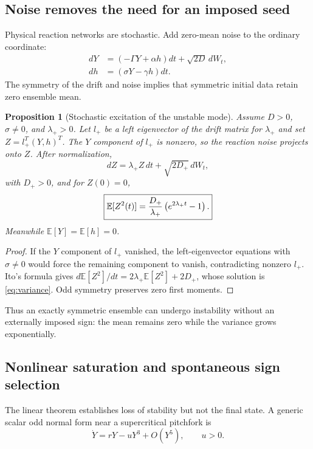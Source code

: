 \documentclass[11pt]{article}
\newtheorem{proposition}[theorem]{Proposition}
\theoremstyle{definition}
\theoremstyle{remark}
\begin{document}
\subsection{Noise removes the need for an imposed seed}
Physical reaction networks are stochastic.  Add zero-mean noise to the ordinary coordinate:
\begin{align}
 dY&=(-\Gamma Y+\alpha h)dt+\sqrt{2D}\,dW_t,\label{eq:sdeY}\\
 dh&=(\sigma Y-\gamma h)dt.\label{eq:sdeh}
\end{align}
The symmetry of the drift and noise implies that symmetric initial data retain zero ensemble mean.

\begin{proposition}[Stochastic excitation of the unstable mode]\label{prop:noise}
Assume $D>0$, $\sigma\ne0$, and $\lambda_+>0$.  Let $l_+$ be a left eigenvector of the drift matrix for $\lambda_+$ and set $Z=l_+^T(Y,h)^T$.  The $Y$ component of $l_+$ is nonzero, so the reaction noise projects onto $Z$.  After normalization,
\begin{equation}
 dZ=\lambda_+Z\,dt+\sqrt{2D_+}\,dW_t,
\end{equation}
with $D_+>0$, and for $Z(0)=0$,
\begin{equation}
 \boxed{\mathbb E[Z^2(t)]={D_+\over\lambda_+}\left(e^{2\lambda_+t}-1\right).}
 \label{eq:variance}
\end{equation}
Meanwhile $\mathbb E[Y]=\mathbb E[h]=0$.
\end{proposition}
\begin{proof}
If the $Y$ component of $l_+$ vanished, the left-eigenvector equations with $\sigma\ne0$ would force the remaining component to vanish, contradicting nonzero $l_+$.  Ito's formula gives $d\mathbb E[Z^2]/dt=2\lambda_+\mathbb E[Z^2]+2D_+$, whose solution is \eqref{eq:variance}.  Odd symmetry preserves zero first moments.
\end{proof}

Thus an exactly symmetric ensemble can undergo instability without an externally imposed sign: the mean remains zero while the variance grows exponentially.

\subsection{Nonlinear saturation and spontaneous sign selection}
The linear theorem establishes loss of stability but not the final state.  A generic scalar odd normal form near a supercritical pitchfork is
\begin{equation}
 \dot Y=rY-uY^3+O(Y^5),\qquad u>0.
 \label{eq:pitch}
\end{equation}
\end{document}
